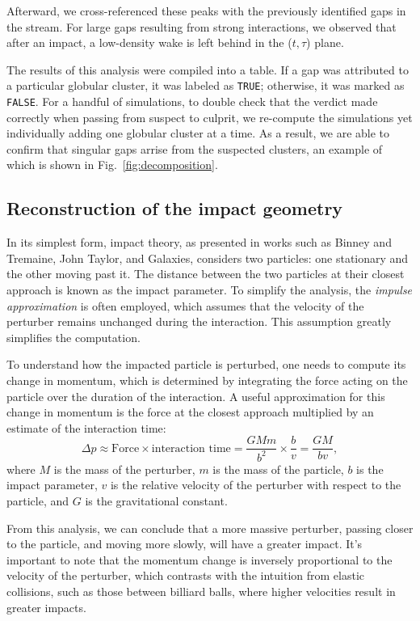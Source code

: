 \documentclass[draft]{aa}
\begin{document}
      Afterward, we cross-referenced these peaks with the previously identified gaps in the stream. For large gaps resulting from strong interactions, we observed that after an impact, a low-density wake is left behind in the ($t,\tau$) plane.

      The results of this analysis were compiled into a table. If a gap was attributed to a particular globular cluster, it was labeled as \texttt{TRUE}; otherwise, it was marked as \texttt{FALSE}. For a handful of simulations, to double check that the verdict made correctly when passing from suspect to culprit, we re-compute the simulations yet individually adding one globular cluster at a time. As a result, we are able to confirm that singular gaps arrise from the suspected clusters, an example of which is shown in Fig.~\ref{fig:decomposition}.


  \subsection{Reconstruction of the impact geometry}
    In its simplest form, impact theory, as presented in works such as Binney and Tremaine, John Taylor, and Galaxies, considers two particles: one stationary and the other moving past it. The distance between the two particles at their closest approach is known as the impact parameter. To simplify the analysis, the \textit{impulse approximation} is often employed, which assumes that the velocity of the perturber remains unchanged during the interaction. This assumption greatly simplifies the computation.

    To understand how the impacted particle is perturbed, one needs to compute its change in momentum, which is determined by integrating the force acting on the particle over the duration of the interaction. A useful approximation for this change in momentum is the force at the closest approach multiplied by an estimate of the interaction time:
    \begin{equation} 
      \Delta p \approx \text{Force} \times \text{interaction time} = \frac{GMm}{b^2} \times \frac{b}{v} = \frac{GM}{bv}, 
      \end{equation} \label{eq:change_in_momentum}
    where $M$ is the mass of the perturber, $m$ is the mass of the particle, $b$ is the impact parameter, $v$ is the relative velocity of the perturber with respect to the particle, and $G$ is the gravitational constant.

    From this analysis, we can conclude that a more massive perturber, passing closer to the particle, and moving more slowly, will have a greater impact. It's important to note that the momentum change is inversely proportional to the velocity of the perturber, which contrasts with the intuition from elastic collisions, such as those between billiard balls, where higher velocities result in greater impacts.
\end{document}
